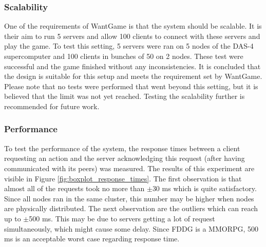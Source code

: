 	\subsubsection{Scalability}
	\label{subsubsec:scalability} 
		One of the requirements of WantGame is that the system should be scalable. It is their aim to run 5 servers and allow 100 clients to connect with these servers and play the game.
		To test this setting, 5 servers were ran on 5 nodes of the DAS-4 supercomputer and 100 clients in bunches of 50 on 2 nodes. These test were successful and the game finished without any inconsistencies. It is concluded that the design is suitable for this setup and meets the requirement set by WantGame.
		Please note that no tests were performed that went beyond this setting, but it is believed that the limit was not yet reached. Testing the scalability further is recommended for future work.
		
	\subsubsection{Performance}
	\label{subsubsec:performance}
		To test the performance of the system, the response times between a client requesting an action and the server acknowledging this request (after having communicated with its peers) was measured. 
		The results of this experiment are visible in Figure \ref{fig:boxplot_response_times}.
		The first observation is that almost all of the requests took no more than $\pm$30 ms which is quite satisfactory. Since all nodes ran in the same cluster, this number may be higher when nodes are physically distributed.
		The next observation are the outliers which can reach up to $\pm$500 ms. 
		This may be due to servers getting a lot of request simultaneously, which might cause some delay.
		Since FDDG is a MMORPG, 500 ms is an acceptable worst case regarding response time.
		
